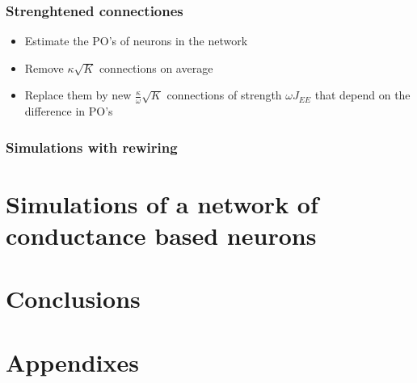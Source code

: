 \documentclass[%
 reprint,
 amsmath,amssymb,
 aps,
]{revtex4-1}
\begin{document}
\subsubsection{Strenghtened connectiones}
\begin{itemize}
    \item Estimate the PO's of neurons in the network
	\item Remove $\kappa \sqrt{K}$ connections on average
	\item Replace them by new $\frac{\kappa}{\omega} \sqrt{K}$ connections of strength $\omega J_{EE}$ that depend on the difference in PO's
\end{itemize}

\subsubsection{Simulations with rewiring} 

\section{Simulations of a network of conductance based neurons }
\lipsum[1]

\section{Conclusions}
\lipsum[1]



\appendix

\section*{Appendixes}

\nocite{*}

\end{document}
